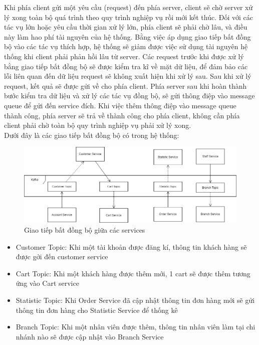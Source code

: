 Khi phía client gửi một yêu cầu (request) đến phía server, client sẽ chờ server xử lý xong toàn bộ quá trình theo quy trình nghiệp vụ rồi mới kết thúc. Đối với các tác vụ lớn hoặc yêu cầu thời gian xử lý lớn, phía client sẽ phải chờ lâu, và điều này làm hao phí tài nguyên của hệ thống. Bằng việc áp dụng giao tiếp bất đồng bộ vào các tác vụ thích hợp, hệ thống sẽ giảm được việc sử dụng tài nguyên hệ thống khi client phải phản hồi lâu từ server. Các request trước khi được xử lý bằng giao tiếp bất đồng bộ sẽ được kiểm tra kĩ về mặt dữ liệu, để đảm bảo các lỗi liên quan đến dữ liệu request sẽ không xuất hiện khi xử lý sau. Sau khi xử lý request, kết quả sẽ được gửi về cho phía client. Phía server sau khi hoàn thành bước kiểm tra dữ liệu và xử lý các tác vụ đồng bộ, sẽ gửi thông điệp vào message queue để gửi đến service đích. Khi việc thêm thông điệp vào message queue thành công, phía server sẽ trả về thành công cho phía client, không cần phía client phải chờ toàn bộ quy trình nghiệp vụ phải xử lý xong.\\

Dưới đây là các giao tiếp bất đồng bộ có trong hệ thống:

\begin{figure}[!htp]
	\centering
	\includegraphics[width=16cm]{img/Architecture/kafka.png}
	\newline
	\caption{Giao tiếp bất đồng bộ giữa các services}
\end{figure}

\begin{itemize}
	\item Customer Topic: Khi một tài khoản được đăng kí, thông tin khách hàng sẽ được gởi đến customer service
	\item Cart Topic: Khi một khách hàng được thêm mới, 1 cart sẽ được thêm tương ứng vào Cart service
	\item Statistic Topic: Khi Order Service đã cập nhật thông tin đơn hàng mới sẽ gửi thông tin đơn hàng cho Statistic Service để thống kê
	\item Branch Topic: Khi một nhân viên được thêm, thông tin nhân viên làm tại chi nhánh nào sẽ được cập nhật vào Branch Service
\end{itemize}